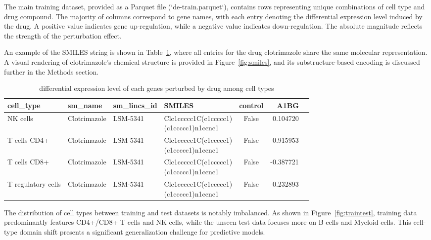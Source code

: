 \documentclass[11pt, oneside]{article}   	%
\begin{document}
The main training dataset, provided as a Parquet file (`de-train.parquet`), contains rows representing unique combinations of cell type and drug compound. The majority of columns correspond to gene names, with each entry denoting the differential expression level induced by the drug. A positive value indicates gene up-regulation, while a negative value indicates down-regulation. The absolute magnitude reflects the strength of the perturbation effect. 

An example of the SMILES string is shown in Table~\ref{tab:de_train}, where all entries for the drug clotrimazole share the same molecular representation. A visual rendering of clotrimazole’s chemical structure is provided in Figure~\ref{fig:smiles}, and its substructure-based encoding is discussed further in the Methods section.



\begin{table}[htbp]
\centering
\small
\begin{tabular}{|l|l|l|l|c|r|r|}
\hline
\textbf{cell\_type} & \textbf{sm\_name} & \textbf{sm\_lincs\_id} & \textbf{SMILES} & \textbf{control} & \textbf{A1BG} \\
\hline
NK cells & Clotrimazole & LSM-5341 & \makecell[l]{Clc1ccccc1C(c1ccccc1)\\(c1ccccc1)n1ccnc1} & False & 0.104720  \\
\hline
T cells CD4+ & Clotrimazole & LSM-5341 & \makecell[l]{Clc1ccccc1C(c1ccccc1)\\(c1ccccc1)n1ccnc1} & False & 0.915953 \\
\hline
T cells CD8+ & Clotrimazole & LSM-5341 & \makecell[l]{Clc1ccccc1C(c1ccccc1)\\(c1ccccc1)n1ccnc1} & False & -0.387721  \\
\hline
T regulatory cells & Clotrimazole & LSM-5341 & \makecell[l]{Clc1ccccc1C(c1ccccc1)\\(c1ccccc1)n1ccnc1} & False & 0.232893  \\
\hline
\end{tabular}
\caption{differential expression level of each genes perturbed by drug among cell types}
\label{tab:de_train}
\end{table}


The distribution of cell types between training and test datasets is notably imbalanced. As shown in Figure~\ref{fig:traintest}, training data predominantly features CD4+/CD8+ T cells and NK cells, while the unseen test data focuses more on B cells and Myeloid cells. This cell-type domain shift presents a significant generalization challenge for predictive models.
\end{document}
